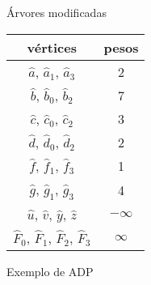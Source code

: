 \documentclass{IFES-beamer}
\newcommand{\defi}[1]{\textbf{#1}} %
\begin{document}
\begin{frame}{Árvores modificadas}
\begin{minipage}[H]{0.3\textwidth}
\centering
\begin{tabular}{| c  c |} 
 \hline
 vértices & pesos\\
 \hline
 $\hat a$, $\hat a_1$, $\hat a_3$ & 2 \\ 
 \hline
 $\hat b$, $\hat b_0$, $\hat b_2$ & 7 \\
 \hline
 $\hat c$, $\hat c_0$, $\hat c_2$ & 3 \\
 \hline
 $\hat d$, $\hat d_0$, $\hat d_2$ & 2 \\
 \hline
 $\hat f$, $\hat f_1$, $\hat f_3$ & 1 \\
 \hline
 $\hat g$, $\hat g_1$, $\hat g_3$ & 4 \\
 \hline
 $\hat u$, $\hat v$, $\hat y$, $\hat z$ & $-\infty$ \\
 \hline
 $\hat F_0$, $\hat F_1$, $\hat F_2$, $\hat F_3$ & $\infty$ \\
 \hline
\end{tabular}
\end{minipage}
\begin{minipage}[H]{0.5\textwidth}
    \centering
\scalebox{.7}{

}
\end{minipage}
\end{frame}

\begin{frame}{Exemplo de ADP}
\begin{figure}[htb]
\scalebox{1}{
\centering

}
\label{fig:MSF-figura-4}
\end{figure}
\end{frame}

%
\end{document}
